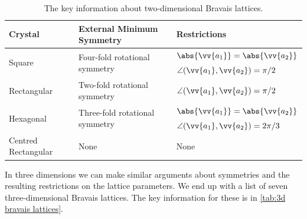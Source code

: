 \documentclass[fleqn]{NotesClass}
\begin{document}
    \begin{table}
        \caption{The key information about two-dimensional Bravais lattices.}
        \label{tab:2d bravais lattices}
        \begin{tabular}{lll}
            \toprule
            Crystal & External Minimum Symmetry & Restrictions\\ \midrule
            \multirow{2}{*}{Square} & \multirow{2}{*}{Four-fold rotational symmetry} & \(\abs{\vv{a_1}} = \abs{\vv{a_2}}\)\\
            && \(\angle(\vv{a_1},\vv{a_2}) = \pi/2\)\\\midrule
            Rectangular & Two-fold rotational symmetry & \(\angle(\vv{a_1},\vv{a_2}) = \pi/2\)\\\midrule
            \multirow{2}{*}{Hexagonal} & \multirow{2}{*}{Three-fold rotational symmetry} & \(\abs{\vv{a_1}} = \abs{\vv{a_2}}\)\\
            && \(\angle(\vv{a_1},\vv{a_2}) = 2\pi/3\)\\
            Centred Rectangular & None & None\\
            \bottomrule
        \end{tabular}
    \end{table}
    
    In three dimensions we can make similar arguments about symmetries and the resulting restrictions on the lattice parameters.
    We end up with a list of seven three-dimensional Bravais lattices.
    The key information for these is in \cref{tab:3d bravais lattices}.
    
\end{document}
